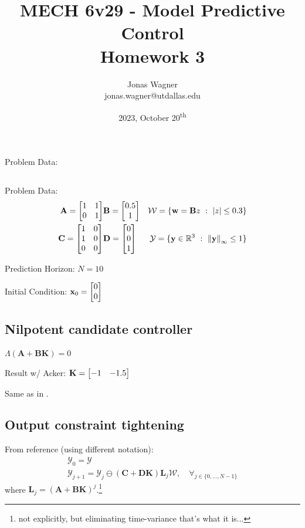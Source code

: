 \documentclass[]{article}
\title{
    MECH 6v29 - Model Predictive Control\\ 
    Homework 3
}
\author{Jonas Wagner\\ jonas.wagner@utdallas.edu}
\date{2023, October 20\textsuperscript{th}}
\newcommand{\R}{\mathbb{R}}
\newcommand{\st}{\ : \ }
\begin{document}
\maketitle

\tableofcontents

\newpage
\section{}
Problem Data:

\subsection{}
Problem Data:
\begin{equation}
    \begin{aligned}
        \mathbf{A} = \mqty[1&1\\0&1] & \mathbf{B} = \mqty[0.5\\1] & \mathcal{W} = \{\vb{w} = \mathbf{B} z \st \abs{z} \leq 0.3\}\\
        \mathbf{C} = \mqty[1&0\\1&0\\0&0] & \mathbf{D} = \mqty[0\\0\\1] & \mathcal{Y} = \{\vb{y} \in \R^3 \st \norm{\vb{y}}_{\infty} \leq 1\}
    \end{aligned}
\end{equation}

Prediction Horizon:
$N = 10$

Initial Condition:
$\vb{x}_0 = \mqty[0\\0]$

\subsection{Nilpotent candidate controller}
$\Lambda(\mathbf{A+BK}) = 0$

Result w/ Acker:
$\vb{K} = \mqty[-1 & -1.5]$

Same as in \cite{}.


\subsection{Output constraint tightening}
From reference (using different notation):
\begin{equation}
    \begin{aligned}
        \mathcal{Y}_0 = \mathcal{Y}\\
        \mathcal{Y}_{j+1} = \mathcal{Y}_{j} \ominus (\mathbf{C + DK}) \mathbf{L}_{j} \mathcal{W}, \quad \forall_{j \in \{0,\dots,N-1\}}
    \end{aligned}
\end{equation}
where $\mathbf{L}_{j} = (\mathbf{A+BK})^{j}$.\footnote{not explicitly, but eliminating time-variance that's what it is...}
\end{document}
